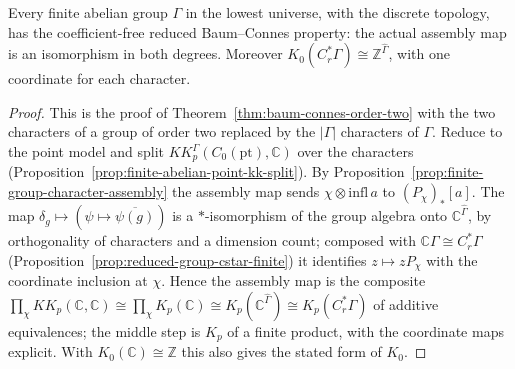 \begin{theorem}\label{thm:baum-connes-finite-abelian}
\leanok
Every finite abelian group $\Gamma$ in the lowest universe, with the discrete
topology, has the coefficient-free reduced Baum--Connes property: the actual
assembly map is an isomorphism in both degrees. Moreover
$K_0(C^*_r\Gamma)\cong\mathbb Z^{\widehat\Gamma}$, with one coordinate for each
character.
\end{theorem}
\begin{proof}
\leanok
This is the proof of Theorem~\ref{thm:baum-connes-order-two} with the two
characters of a group of order two replaced by the $|\Gamma|$ characters of
$\Gamma$. Reduce to the point model and split
$KK^\Gamma_p(C_0(\mathrm{pt}),\mathbb C)$ over the characters
(Proposition~\ref{prop:finite-abelian-point-kk-split}). By
Proposition~\ref{prop:finite-group-character-assembly} the assembly map sends
$\chi\otimes\mathrm{infl}\,a$ to $(P_\chi)_*[a]$. The map
$\delta_g\mapsto(\psi\mapsto\overline{\psi(g)})$ is a $*$-isomorphism of the group
algebra onto $\mathbb C^{\widehat\Gamma}$, by orthogonality of characters and a
dimension count; composed with $\mathbb C\Gamma\cong C^*_r\Gamma$
(Proposition~\ref{prop:reduced-group-cstar-finite}) it identifies
$z\mapsto zP_\chi$ with the coordinate inclusion at $\chi$. Hence the assembly map is
the composite
$\prod_\chi KK_p(\mathbb C,\mathbb C)\cong\prod_\chi K_p(\mathbb C)\cong
K_p(\mathbb C^{\widehat\Gamma})\cong K_p(C^*_r\Gamma)$ of additive equivalences;
the middle step is $K_p$ of a finite product, with the coordinate maps explicit.
With $K_0(\mathbb C)\cong\mathbb Z$ this also gives the stated form of $K_0$.
\end{proof}

